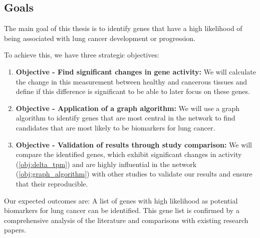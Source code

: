 \subsection{Goals} \label{subsec:goals}

The main goal of this thesis is to identify genes that have a high likelihood
of being associated with lung cancer development or progression.


To achieve this, we have three strategic objectives:
\begin{enumerate}
    \item \textbf{Objective - Find significant changes in gene activity:}
    We will calculate the change in this measurement between healthy and cancerous tissues
    and define if this difference is significant
    to be able to later focus on these genes.
    \label{obj:delta_tpm}

    \item \textbf{Objective - Application of a graph algorithm:}
    We will use a graph algorithm to identify genes that are most central in the network
    to find candidates that are most likely to be biomarkers for lung cancer.
    \label{obj:graph_algorithm}

    \item \textbf{Objective - Validation of results through study comparison:}
    We will compare the identified genes,
    which exhibit significant changes in activity (\ref{obj:delta_tpm})
    and are highly influential in the network (\ref{obj:graph_algorithm}) with other studies
    to validate our results and ensure that their reproducible.
    \label{obj:validation}
\end{enumerate}



{\color{lightgray}
Our expected outcomes are:
A list of genes with high likelihood as potential biomarkers for lung cancer can be identified.
This gene list is confirmed by a comprehensive analysis of the literature and comparisons with existing research papers.
}